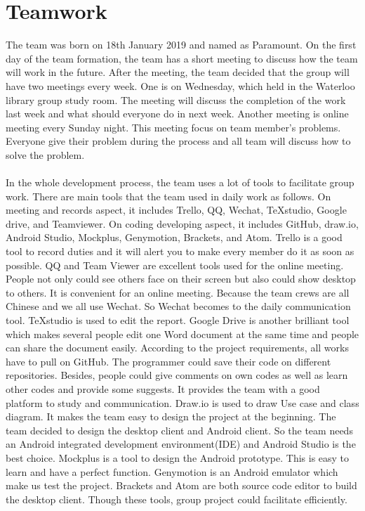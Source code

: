 \documentclass[11pt]{article}
\begin{document}
\section{Teamwork}
The team was born on 18th January 2019 and named as Paramount. On the first day of the team formation, the team has a short meeting to discuss how the team will work in the future. After the meeting, the team decided that the group will have two meetings every week. One is on Wednesday, which held in the Waterloo library group study room. The meeting will discuss the completion of the work last week and what should everyone do in next week. Another meeting is online meeting every Sunday night. This meeting focus on team member’s problems. Everyone give their problem during the process and all team will discuss how to solve the problem.
\\
\\
In the whole development process, the team uses a lot of tools to facilitate group work. There are main tools that the team used in daily work as follows. On meeting and records aspect, it includes Trello, QQ, Wechat, TeXstudio, Google drive, and Teamviewer. On coding developing aspect, it includes GitHub, draw.io, Android Studio, Mockplus, Genymotion, Brackets, and Atom. Trello is a good tool to record duties and it will alert you to make every member do it as soon as possible. QQ and Team Viewer are excellent tools used for the online meeting. People not only could see others face on their screen but also could show desktop to others. It is convenient for an online meeting. Because the team crews are all Chinese and we all use Wechat. So Wechat becomes to the daily communication tool. TeXstudio is used to edit the report. Google Drive is another brilliant tool which makes several people edit one Word document at the same time and people can share the document easily. According to the project requirements, all works have to pull on GitHub. The programmer could save their code on different repositories. Besides, people could give comments on own codes as well as learn other codes and provide some suggests. It provides the team with a good platform to study and communication. Draw.io is used to draw Use case and class diagram. It makes the team easy to design the project at the beginning. The team decided to design the desktop client and Android client. So the team needs an Android integrated development environment(IDE) and Android Studio is the best choice. Mockplus is a tool to design the Android prototype. This is easy to learn and have a perfect function. Genymotion is an Android emulator which make us test the project. Brackets and Atom are both source code editor to build the desktop client. Though these tools, group project could facilitate efficiently.
\end{document}
